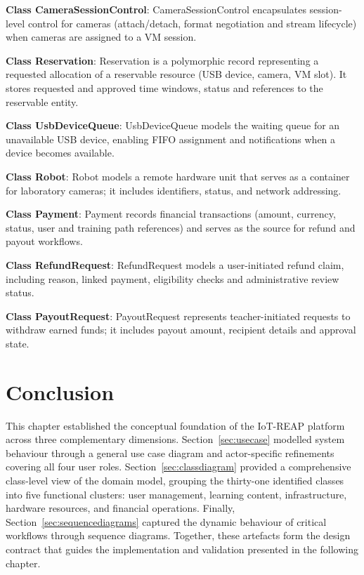 \textbf{Class CameraSessionControl}: CameraSessionControl encapsulates
session-level control for cameras (attach/detach, format negotiation and stream
lifecycle) when cameras are assigned to a VM session.

\textbf{Class Reservation}: Reservation is a polymorphic record representing a
requested allocation of a reservable resource (USB device, camera, VM slot).
It stores requested and approved time windows, status and references to the
reservable entity.

\textbf{Class UsbDeviceQueue}: UsbDeviceQueue models the waiting queue for an
unavailable USB device, enabling FIFO assignment and notifications when a
device becomes available.

\textbf{Class Robot}: Robot models a remote hardware unit that serves as a container
for laboratory cameras; it includes identifiers, status, and network addressing.

\textbf{Class Payment}: Payment records financial transactions (amount,
currency, status, user and training path references) and serves as the source
for refund and payout workflows.

\textbf{Class RefundRequest}: RefundRequest models a user-initiated refund
claim, including reason, linked payment, eligibility checks and administrative
review status.

\textbf{Class PayoutRequest}: PayoutRequest represents teacher-initiated
requests to withdraw earned funds; it includes payout amount, recipient details
and approval state.




\newpage
\section*{Conclusion}

This chapter established the conceptual foundation of the IoT-REAP platform
across three complementary dimensions. Section~\ref{sec:usecase} modelled
system behaviour through a general use case diagram and actor-specific
refinements covering all four user roles. Section~\ref{sec:classdiagram}
provided a comprehensive class-level view of the domain model, grouping the
thirty-one identified classes into five functional clusters: user management,
learning content, infrastructure, hardware resources, and financial operations.
Finally, Section~\ref{sec:sequencediagrams} captured the dynamic behaviour of
critical workflows through sequence diagrams. Together, these artefacts form
the design contract that guides the implementation and validation presented
in the following chapter.

\cleardoublepage
